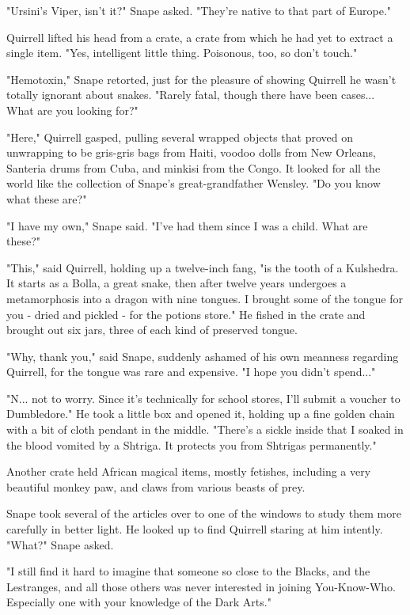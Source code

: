 \documentclass[a4paper,11pt]{article}
\begin{document}
"Ursini's Viper, isn't it?" Snape asked. "They're native to that part of Europe."

Quirrell lifted his head from a crate, a crate from which he had yet to extract a single item. "Yes, intelligent little thing. Poisonous, too, so don't touch."

"Hemotoxin," Snape retorted, just for the pleasure of showing Quirrell he wasn't totally ignorant about snakes. "Rarely fatal, though there have been cases... What are you looking for?"

"Here," Quirrell gasped, pulling several wrapped objects that proved on unwrapping to be gris-gris bags from Haiti, voodoo dolls from New Orleans, Santeria drums from Cuba, and minkisi from the Congo. It looked for all the world like the collection of Snape's great-grandfather Wensley. "Do you know what these are?"

"I have my own," Snape said. "I've had them since I was a child. What are these?"

"This," said Quirrell, holding up a twelve-inch fang, "is the tooth of a Kulshedra. It starts as a Bolla, a great snake, then after twelve years undergoes a metamorphosis into a dragon with nine tongues. I brought some of the tongue for you - dried and pickled - for the potions store." He fished in the crate and brought out six jars, three of each kind of preserved tongue.

"Why, thank you," said Snape, suddenly ashamed of his own meanness regarding Quirrell, for the tongue was rare and expensive. "I hope you didn't spend..."

"N... not to worry. Since it's technically for school stores, I'll submit a voucher to Dumbledore." He took a little box and opened it, holding up a fine golden chain with a bit of cloth pendant in the middle. "There's a sickle inside that I soaked in the blood vomited by a Shtriga. It protects you from Shtrigas permanently."

Another crate held African magical items, mostly fetishes, including a very beautiful monkey paw, and claws from various beasts of prey.

Snape took several of the articles over to one of the windows to study them more carefully in better light. He looked up to find Quirrell staring at him intently. "What?" Snape asked.

"I still find it hard to imagine that someone so close to the Blacks, and the Lestranges, and all those others was never interested in joining You-Know-Who. Especially one with your knowledge of the Dark Arts."
\end{document}
